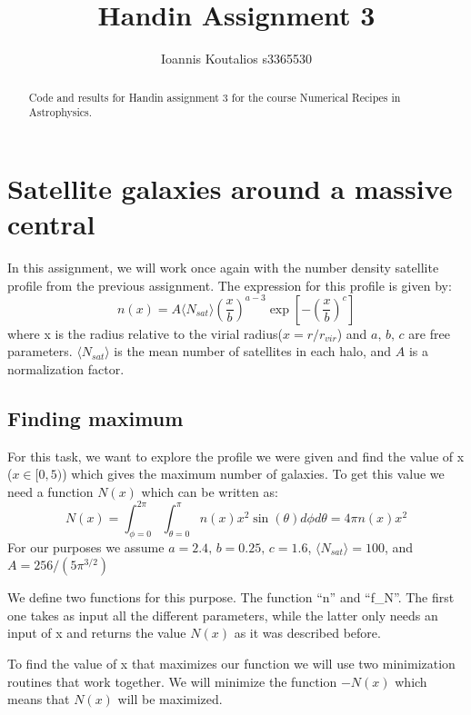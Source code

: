 \documentclass[a4paper,10pt]{article}
\title{Handin Assignment 3}
\author{Ioannis Koutalios s3365530}
\begin{document}
\maketitle


\begin{abstract}
 Code and results for Handin assignment 3 for the course Numerical Recipes in Astrophysics.
\end{abstract}

\section{Satellite galaxies around a massive central}

In this assignment, we will work once again with the number density satellite profile from the previous assignment. The expression for this profile is given by:
\begin{equation}
  n(x) = A \langle N_{sat} \rangle \left(\frac{x}{b}\right)^{a-3} \exp[-\left(\frac{x}{b}\right)^c]
\end{equation}
where x is the radius relative to the virial radius($x=r/r_{vir}$) and $a,\, b,\, c$ are free parameters. $\langle N_{sat} \rangle $ is the mean number of satellites in
each halo, and $A$ is a normalization factor. 

\subsection{Finding maximum}
\label{chap:max}

For this task, we want to explore the profile we were given and find the value of x ($x \in [0,5)$) which gives the maximum number of galaxies. To get this value we need a function $N(x)$ which can be written as:
\begin{equation}
  N(x)= \int_{\phi=0}^{2\pi} \int_{\theta=0}^{\pi} n(x) x^2 \sin(\theta) d\phi d\theta =4 \pi n(x) x^2
\end{equation}
For our purposes we assume $a=2.4,\, b = 0.25,\, c = 1.6$, $\langle N_{sat} \rangle = 100$, and $A=256/(5\pi^{3/2})$

We define two functions for this purpose. The function ``n'' and ``f\_N''. The first one takes as input all the different parameters, while the latter only needs an input of x and returns the value $N(x)$ as it was described before.

To find the value of x that maximizes our function we will use two minimization routines that work together. We will minimize the function $-N(x)$ which means that $N(x)$ will be maximized.
\end{document}
